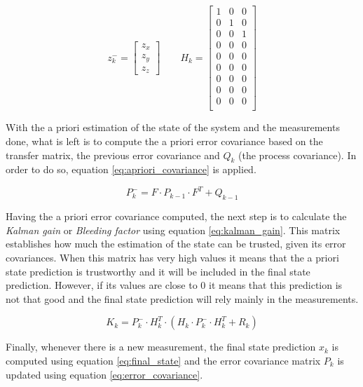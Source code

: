 \begin{equation}
z_{k}^{-}=
\begin{bmatrix}
z_{x} \\ z_{y} \\ z_{z}
\end{bmatrix}
\qquad
H_{k}=
\begin{bmatrix}
1 & 0 & 0 \\
0 & 1 & 0 \\
0 & 0 & 1 \\
0 & 0 & 0 \\
0 & 0 & 0 \\
0 & 0 & 0 \\
0 & 0 & 0 \\
0 & 0 & 0 \\
0 & 0 & 0 \\
\end{bmatrix}
\label{eq:measurements_mats}
\end{equation}

With the a priori estimation of the state of the system and the measurements done, what is left is to compute the a priori error covariance \cite{OReilly} based on the transfer matrix, the previous error covariance and $Q_{k}$ (the process covariance). In order to do so, equation \eqref{eq:apriori_covariance} is applied.

\begin{equation}
P_{k}^{-}=F \cdot P_{k-1} \cdot F^{T}+Q_{k-1}
\label{eq:apriori_covariance}
\end{equation}

Having the a priori error covariance computed, the next step is to calculate the \emph{Kalman gain} or \emph{Bleeding factor} using equation \eqref{eq:kalman_gain}. This matrix establishes how much the estimation of the state can be trusted, given its error covariances. When this matrix has very high values it means that the a priori state prediction is trustworthy and it will be included in the final state prediction. However, if its values are close to 0 it means that this prediction is not that good and the final state prediction will rely mainly in the measurements.

\begin{equation}
K_{k}=P_{k}^{-} \cdot H_{k}^{T} \cdot (H_{k} \cdot P_{k}^{-} \cdot H_{k}^{T}+R_{k})
\label{eq:kalman_gain}
\end{equation}

Finally, whenever there is a new measurement, the final state prediction $x_{k}$ is computed using equation \eqref{eq:final_state} and the error covariance matrix $P_{k}$ is updated using equation \eqref{eq:error_covariance}.

